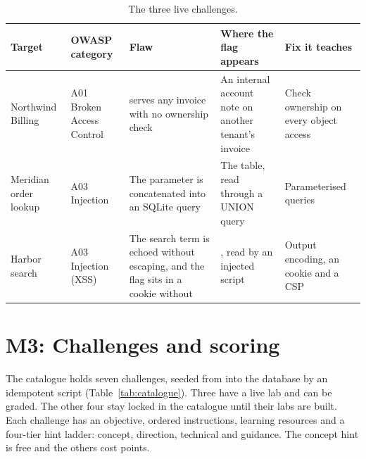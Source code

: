 \begin{table}[!htbp]
\centering
\caption{The three live challenges.}
\label{tab:labs}
\tablefont
\begin{tabularx}{\linewidth}{@{}P{2.3cm} P{2.3cm} L P{3.3cm} P{2.6cm}@{}}
\toprule
\textbf{Target} & \textbf{OWASP category} & \textbf{Flaw} & \textbf{Where the flag appears} & \textbf{Fix it teaches} \\
\midrule
Northwind Billing & A01 Broken Access Control &  serves any invoice with no ownership check & An internal account note on another tenant's invoice & Check ownership on every object access \\
Meridian order lookup & A03 Injection & The  parameter is concatenated into an SQLite query & The  table, read through a UNION query & Parameterised queries \\
Harbor search & A03 Injection (XSS) & The search term is echoed without escaping, and the flag sits in a cookie without  & , read by an injected script & Output encoding, an  cookie and a CSP \\
\bottomrule
\end{tabularx}
\end{table}

\section{M3: Challenges and scoring}

The catalogue holds seven challenges, seeded from  into the database by an idempotent script (Table~\ref{tab:catalogue}). Three have a live lab and can be graded. The other four stay locked in the catalogue until their labs are built. Each challenge has an objective, ordered instructions, learning resources and a four-tier hint ladder: concept, direction, technical and guidance. The concept hint is free and the others cost points.


